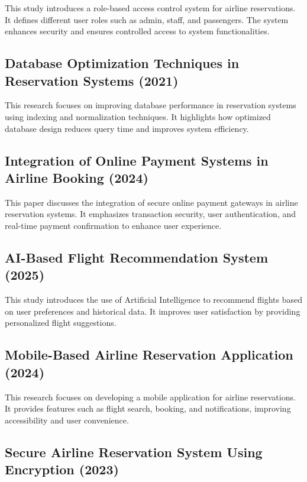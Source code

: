 This study introduces a role-based access control system for airline reservations. It defines different user roles such as admin, staff, and passengers. The system enhances security and ensures controlled access to system functionalities.

\subsection{Database Optimization Techniques in Reservation Systems (2021)}

This research focuses on improving database performance in reservation systems using indexing and normalization techniques. It highlights how optimized database design reduces query time and improves system efficiency.

\subsection{Integration of Online Payment Systems in Airline Booking (2024)}

This paper discusses the integration of secure online payment gateways in airline reservation systems. It emphasizes transaction security, user authentication, and real-time payment confirmation to enhance user experience.

\subsection{AI-Based Flight Recommendation System (2025)}

This study introduces the use of Artificial Intelligence to recommend flights based on user preferences and historical data. It improves user satisfaction by providing personalized flight suggestions.

\subsection{Mobile-Based Airline Reservation Application (2024)}

This research focuses on developing a mobile application for airline reservations. It provides features such as flight search, booking, and notifications, improving accessibility and user convenience.

\subsection{Secure Airline Reservation System Using Encryption (2023)}

